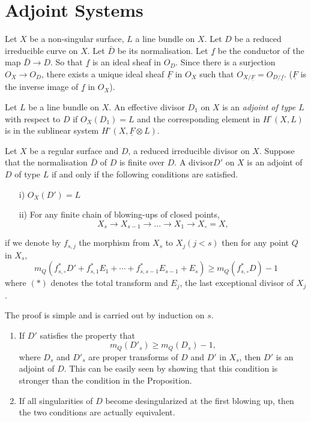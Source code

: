 \section{Adjoint Systems}\label{chap2:sec7} Let $X$ be a non-singular
surface, $L$ a line bundle on $X$. Let $D$ be a reduced irreducible
curve on $X$. Let $\bar{D}$ be its normalisation. Let $\underline{f}$
be the conductor of the map $\bar{D}\longrightarrow D$. So that
$\underline{f}$ is an ideal sheaf in $O_D$. Since there is a
surjection $O_X\longrightarrow O_D$, there exists a unique ideal sheaf
$\underline{F}$ in $O_X$ such that $O_{X/\underline{F}}=O_{D/
\underline{f}}$. ($\underline{F}$ is the inverse image of
$\underline{f}$ in $O_X$).
\begin{def*}
Let $L$ be a line bundle on $X$. An effective divisor $D_1$ on $X$ is
an {\it adjoint of type $L$} with respect to $D$ if $O_X(D_1)=L$ and
the corresponding element in $H^\circ(X,L)$ is in the sublinear system
$H^\circ(X,\underline{F}\otimes L)$. 
\end{def*}

\begin{Prop*}
Let $X$ be a regular surface and $D$, a reduced irreducible divisor on
$X$. Suppose that the normalisation $\bar{D}$ of $D$ is finite over
$D$. A divisor\pageoriginale $D'$ on $X$ is an adjoint of $D$ of type
$L$ if and only if the following conditions are satisfied. 
\begin{itemize}
\item [i)] $O_X(D')=L$
\item [ii)] For any finite chain of blowing-ups of closed points,
$$
X_s\longrightarrow X_{s-1}\longrightarrow\ldots\longrightarrow X_1
\longrightarrow X_\circ=X,
$$
\end{itemize}
if we denote by $f_{s,j}$ the morphism from $X_s$ to $X_j(j<s)$ then
for any point $Q$ in $X_s$,
$$
m_Q(f_{s,\circ}^*D'+f_{s,1}^*E_1+\cdots +f_{s,s-1}^*E_{s-1}+E_s)\geq
m_Q(f_{s,\circ}^*D)-1
$$
where $(*)$ denotes the total transform and $E_j$, the last
exceptional divisor of $X_j$. 
\end{Prop*}

The proof is simple and is carried out by induction on $s$.
\begin{REMS*}
\begin{enumerate}
\item If $D'$ satisfies the property that 
$$
m_Q(D'_s)\geq m_Q(D_s)-1,
$$
where $D_s$ and $D'_s$ are proper transforms of $D$ and $D'$ in $X_s$,
then $D'$ is an adjoint of $D$. This can be easily seen by showing
that this condition is stronger than the condition in the Proposition.
\item If all singularities of $D$ become desingularized at the first
blowing up, then the two conditions are actually equivalent. 
\end{enumerate}
\end{REMS*}

